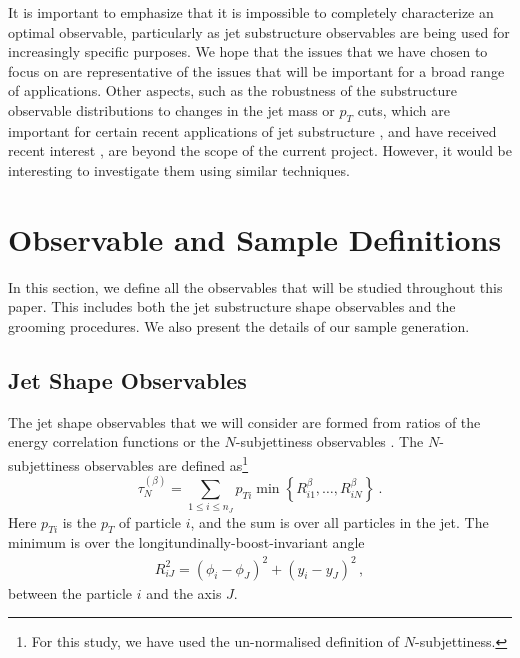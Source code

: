 \documentclass[11pt]{cernrep}
\begin{document}
It is important to emphasize that it is impossible to completely
characterize an optimal observable, particularly as jet substructure
observables are being used for increasingly specific
purposes.
%
We hope that the issues that we have chosen to focus on
are representative of the issues that will be important for a broad
range of applications.
%
Other aspects, such as the robustness of the substructure observable distributions to changes in the jet mass or $p_T$ cuts, which are important for certain recent applications of jet substructure \cite{Sirunyan:2017dgc,CMS-PAS-HIG-17-010,CMS-PAS-EXO-17-001,Sirunyan:2017dnz,Sirunyan:2017nvi,Aaboud:2018zba}, and have received recent interest \cite{Shimmin:2017mfk,Aguilar-Saavedra:2017rzt,Moult:2017okx}, are
beyond the scope of the current project.
However, it would be interesting to investigate them
using similar techniques.




\section{Observable and Sample Definitions}\label{jetsub_2prong_sec:obs_def}

In this section, we define all the observables that will be studied throughout this paper.
%
This includes both the jet substructure shape observables and the grooming procedures.  We also present the details of our sample generation.




\subsection{Jet Shape Observables}\label{jetsub_2prong_sec:shape_def}

The jet shape observables that we will consider are formed from ratios of the energy correlation functions \cite{Larkoski:2013eya,Moult:2016cvt} or the $N$-subjettiness observables \cite{Thaler:2010tr,Thaler:2011gf}.
%
The $N$-subjettiness observables are defined as\footnote{For this
  study, we have used the un-normalised definition of $N$-subjettiness.}~\cite{Stewart:2010tn,Thaler:2010tr,Thaler:2011gf}
%
\begin{equation}\label{jetsub_2prong_eq:nsubdef}
  \tau_{N}^{(\beta)} =
  \sum_{1\leq i \leq n_J} p_{Ti}\min\left\{
R_{i1}^\beta,\dotsc,R_{iN}^\beta
\right\} \ .
\end{equation}
%
Here
$p_{Ti}$ is the $p_T$ of particle $i$, and the sum is over all
particles in the jet.
%
The minimum is over the longitundinally-boost-invariant angle
%
\begin{align}
R_{iJ}^2 = (\phi_i-\phi_J)^2+(y_i-y_J)^2\,,
\end{align}
%
between the particle $i$ and the axis $J$.
\end{document}
